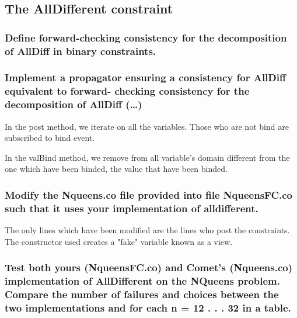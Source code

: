 \documentclass[a4paper ,12pt,french]{article}
\begin{document}
\subsection{The AllDifferent constraint}
\subsubsection{Define forward-checking consistency for the decomposition of AllDiff in binary constraints.}
\subsubsection{Implement a propagator ensuring a consistency for AllDiff equivalent to forward- checking consistency for the decomposition of AllDiff (\dots)}
In the post method, we iterate on all the variables. Those who are not bind are subscribed to bind event.


In the valBind method, we remove from all variable's domain different from the one which have been binded, the value that have been binded.

\subsubsection{Modify the Nqueens.co file provided into file NqueensFC.co such that it uses your implementation of alldifferent.}
The only lines which have been modified are the lines who post the constraints. The constructor used creates a "fake" variable known as a view.

\subsubsection{Test both yours (NqueensFC.co) and Comet’s (Nqueens.co) implementation of AllDifferent on the NQueens problem. Compare the number of failures and choices between the two implementations and for each n = 12 . . . 32 in a table.}
\end{document}
